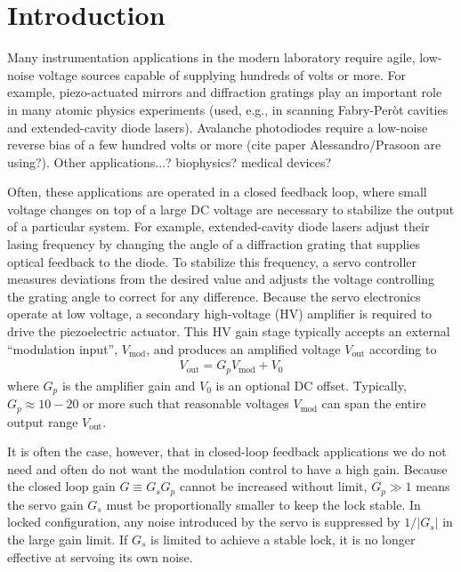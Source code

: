\documentclass[aip,rsi,reprint]{revtex4-1} %
\begin{document}
\section{Introduction}
\label{Sec:Introduction}

Many instrumentation applications in the modern laboratory require agile, low-noise voltage sources capable of supplying hundreds of volts or more.
For example, piezo-actuated mirrors and diffraction gratings play an important role in many atomic physics experiments (used, e.g., in scanning Fabry-Per{\`o}t cavities and extended-cavity diode lasers).
Avalanche photodiodes require a low-noise reverse bias of a few hundred volts or more (cite paper Alessandro/Prasoon are using?).
Other applications...? biophysics? medical devices?

Often, these applications are operated in a closed feedback loop, where small voltage changes on top of a large DC voltage are necessary to stabilize the output of a particular system.
For example, extended-cavity diode lasers adjust their lasing frequency by changing the angle of a diffraction grating that supplies optical feedback to the diode.
To stabilize this frequency, a servo controller measures deviations from the desired value and adjusts the voltage controlling the grating angle to correct for any difference.
Because the servo electronics operate at low voltage, a secondary high-voltage (HV) amplifier is required to drive the piezoelectric actuator.
This HV gain stage typically accepts an external ``modulation input'', $V_{\text{mod}}$, and produces an amplified voltage $V_{\text{out}}$ according to
\begin{align}
V_{\text{out}} = G_p V_{\text{mod}} + V_0
\end{align}
where $G_p$ is the amplifier gain and $V_0$ is an optional DC offset.
Typically, {$G_p\approx \num{10} - \num{20}$} or more such that reasonable voltages $V_{\text{mod}}$ can span the entire output range $V_{\text{out}}$.

It is often the case, however, that in closed-loop feedback applications we do not need and often do not want the modulation control to have a high gain.
Because the closed loop gain $G \equiv G_s G_p$ cannot be increased without limit, $G_p \gg 1$ means the servo gain $G_s$ must be proportionally smaller to keep the lock stable.
In locked configuration, any noise introduced by the servo is suppressed by $1/|G_s|$ in the large gain limit.
If $G_s$ is limited to achieve a stable lock, it is no longer effective at servoing its own noise.
\end{document}
